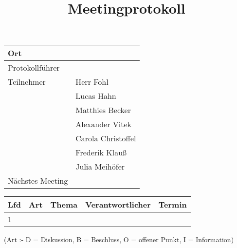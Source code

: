 \documentclass[a4paper]{scrartcl}
\begin{document}
\titlehead{Audio Projekt}
\title{Meetingprotokoll}
\publishers{HAW - Hochschule für Angewandte Wissenschaften Hamburg}
\maketitle

\vfill

\begin{tabular}{|p{3.5cm}|p{10cm}|}
\hline
Ort & \\
\hline
Protokollführer & \\
\hline
Teilnehmer & Herr Fohl\\
& Lucas Hahn\\
& Matthies Becker\\
& Alexander Vitek\\
& Carola Christoffel\\
& Frederik Klauß\\
& Julia Meihöfer\\
\hline
Nächstes Meeting & \\
\hline
\end{tabular}

\pagebreak

\begin{tabular}{|p{1cm}|p{1cm}|p{7cm}|p{3cm}|p{2.5cm}|}
\hline
Lfd & Art & Thema & Verantwortlicher & Termin \\
\hline
1 & & & & \\
\hline
\end{tabular}

(Art :- D = Diskussion, B = Beschluss, O = offener Punkt, I = Information)\\
\end{document}
